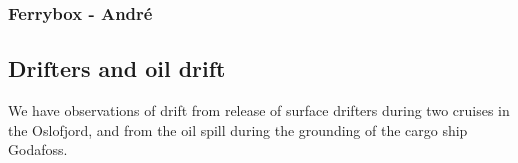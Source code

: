 
\newpage
\subsubsection{Ferrybox - Andr\'{e}}

\newpage
\subsection{Drifters and oil drift}
We have observations of drift from release of surface drifters during two cruises in the Oslofjord, and from the oil spill during the grounding of the cargo ship Godafoss.

